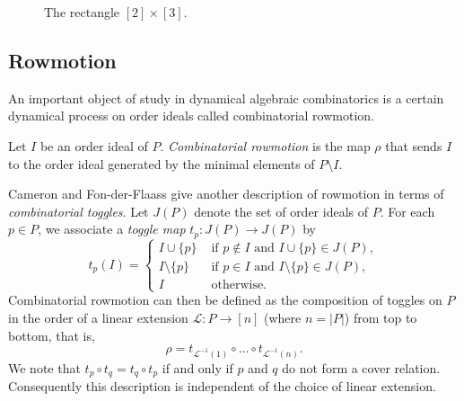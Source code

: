 \documentclass[11pt]{article}
\theoremstyle{definition}
\numberwithin{equation}{section}
\numberwithin{equation}{section}
\begin{document}
\begin{figure}
\captionsetup{justification=centering}

\caption{The rectangle $[2] \times [3]$.}
 \label{squareposet}
\end{figure}

\subsection{Rowmotion}

An important object of study in dynamical algebraic combinatorics is a certain dynamical process on order ideals called combinatorial rowmotion.

\begin{Def}
Let $I$ be an order ideal of $P$. \textit{Combinatorial rowmotion} is the map $\rho$ that sends $I$ to the order ideal generated by the minimal elements of $P \setminus I$.
\end{Def}

Cameron and Fon-der-Flaass \cite{cameronfonderflaass} give another description of rowmotion in terms of \textit{combinatorial toggles}. Let $J(P)$ denote the set of order ideals of $P$. For each $p \in P$, we associate a \emph{toggle map} $t_p \colon J(P) \to J(P)$ by
\[t_p(I) = \begin{cases} I \cup \{p\} &\text{ if } p \not\in I \text{ and } I \cup \{p\} \in J(P), \\
I \setminus \{p\} &\text{ if } p \in I \text{ and } I \setminus \{p\} \in J(P), \\
I &\text{ otherwise.} \end{cases}\]
Combinatorial rowmotion can then be defined as the composition of toggles on $P$ in the order of a linear extension $\mathcal L \colon P \to [n]$ (where $n=|P|$) from top to bottom, that is,
\[\rho = t_{\mathcal{L}^{-1}(1)} \circ \dots \circ t_{\mathcal{L}^{-1}(n)}.\]
We note that $t_p \circ t_q = t_q \circ t_p$ if and only if $p$ and $q$ do not form a cover relation. Consequently this description is independent of the choice of linear extension.
\end{document}
